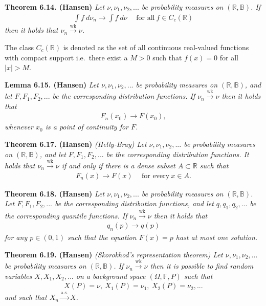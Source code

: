 \documentclass[
]{book}
\begin{document}
\textbf{Theorem 6.14. (Hansen)} \emph{Let \(\nu,\nu_1,\nu_2,...\) be probability measures on \((\mathbb{R},\mathbb{B})\). If}
\begin{align*}
    \int f\ d\nu_n\to \int f\ d\nu\hspace{15pt}\text{for all}\ f\in C_c(\mathbb{R})\tag{6.13}
\end{align*}
\emph{then it holds that \(\nu_n\stackrel{\text{wk}}{\to} \nu\).}

The class \(C_c(\mathbb{R})\) is denoted as the set of all continuous real-valued functions with compact support i.e.~there exist a \(M>0\) such that \(f(x)=0\) for all \(\vert x\vert>M\).

\textbf{Lemma 6.15. (Hansen)} \emph{Let \(\nu,\nu_1,\nu_2,...\) be probability measures on \((\mathbb{R},\mathbb{B})\), and let \(F,F_1,F_2,...\) be the corresponding distribution functions. If \(\nu_n\stackrel{\text{wk}}{\to}\nu\) then it holds that}
\begin{align*}
    F_n(x_0)\to F(x_0),
\end{align*}
\emph{whenever \(x_0\) is a point of continuity for \(F\).}

\textbf{Theorem 6.17. (Hansen)} \emph{(Helly-Bray) Let \(\nu,\nu_1,\nu_2,...\) be probability measures on \((\mathbb{R},\mathbb{B})\), and let \(F,F_1,F_2,...\) be the corresponding distribution functions. It holds that \(\nu_n\stackrel{\text{wk}}{\to}\nu\) if and only if there is a dense subset \(A\subset\mathbb{R}\) such that}
\begin{align*}
    F_n(x)\to F(x)\hspace{15pt}\text{for every}\ x\in A.\tag{6.16}
\end{align*}

\textbf{Theorem 6.18. (Hansen)} \emph{Let \(\nu,\nu_1,\nu_2,...\) be probability measures on \((\mathbb{R},\mathbb{B})\). Let \(F,F_1,F_2,...\) be the corresponding distribution functions, and let \(q,q_1,q_2,...\) be the corresponding quantile functions. If \(\nu_n\stackrel{\text{wk}}{\to}\nu\) then it holds that}
\begin{align*}
    q_n(p)\to q(p)
\end{align*}
\emph{for any \(p\in(0,1)\) such that the equation \(F(x)=p\) hast at most one solution.}

\textbf{Theorem 6.19. (Hansen)} \emph{(Skorokhod's representation theorem) Let \(\nu,\nu_1,\nu_2,...\) be probability measures on \((\mathbb{R},\mathbb{B})\). If \(\nu_n\stackrel{\text{wk}}{\to} \nu\) then it is possible to find random variables \(X,X_1,X_2,...\) on a background space \((\Omega,\mathbb{F},P)\) such that}
\begin{align*}
    X(P)=\nu,\ X_1(P)=\nu_1,\ X_2(P)=\nu_2, ...
\end{align*}
\emph{and such that \(X_n\stackrel{\text{a.s.}}{\to} X\).}
\end{document}
